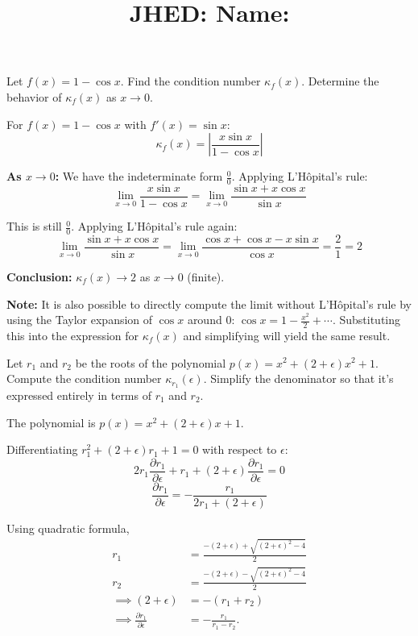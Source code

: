 \documentclass[reqno]{exam}
\title{\normalsize{
  JHED: \underline{\hspace{4cm}} \hspace{1em} Name: \underline{\hspace{9cm}}}
   }
\author{}
\date{}
\begin{document}
\maketitle
\vspace{-2cm} %

\begin{questions}

  \question Let $f(x) = 1 - \cos x$. Find the condition number $\kappa_f(x)$. Determine the behavior of $\kappa_f(x)$ as $x \to 0$.
  \begin{solution}
    For $f(x) = 1 - \cos x$ with $f'(x) = \sin x$:
    $$\kappa_f(x) = \left|\frac{x \sin x}{1 - \cos x}\right|$$

    \textbf{As $x \to 0$:} We have the indeterminate form $\frac{0}{0}$. Applying L'Hôpital's rule:
    $$\lim_{x \to 0} \frac{x \sin x}{1 - \cos x} = \lim_{x \to 0} \frac{\sin x + x \cos x}{\sin x}$$

    This is still $\frac{0}{0}$. Applying L'Hôpital's rule again:
    $$\lim_{x \to 0} \frac{\sin x + x \cos x}{\sin x} = \lim_{x \to 0} \frac{\cos x + \cos x - x \sin x}{\cos x} = \frac{2}{1} = 2$$

    \textbf{Conclusion:} $\kappa_f(x) \to 2$ as $x \to 0$ (finite).
    
    \textbf{Note:} It is also possible to directly compute the limit without L'Hôpital's rule by using the Taylor expansion of $\cos x$ around $0$: $\cos x = 1 - \frac{x^2}{2} + \cdots$. Substituting this into the expression for $\kappa_f(x)$ and simplifying will yield the same result.
  \end{solution}



  \newpage
  \question
  Let $r_1$ and $r_2$ be the roots of the polynomial $p(x) = x^2 + (2 + \epsilon)x^2 + 1$. Compute the condition number $\kappa_{r_1}(\epsilon)$. Simplify the denominator so that it's expressed entirely in terms of $r_1$ and $r_2$.

  \begin{solution}
    The polynomial is $p(x) = x^2 + (2 + \epsilon)x + 1$.

    Differentiating $r_1^2 + (2 + \epsilon)r_1 + 1 = 0$ with respect to $\epsilon$:
    $$2r_1\frac{\partial r_1}{\partial \epsilon} + r_1 + (2 + \epsilon)\frac{\partial r_1}{\partial \epsilon} = 0$$
    $$\frac{\partial r_1}{\partial \epsilon} = -\frac{r_1}{2r_1 + (2 + \epsilon)}$$

    Using quadratic formula,
    \begin{align*}
      r_1                                             & = \frac{-(2 + \epsilon) + \sqrt{(2 + \epsilon)^2 - 4}}{2} \\
      r_2                                             & = \frac{-(2 + \epsilon) - \sqrt{(2 + \epsilon)^2 - 4}}{2} \\
      \implies
      (2 + \epsilon)                                  & = -(r_1 + r_2)                                            \\
      \implies \frac{\partial r_1}{\partial \epsilon} & = -\frac{r_1}{r_1 - r_2}.
    \end{align*}



\end{solution}
\end{questions}
\end{document}
